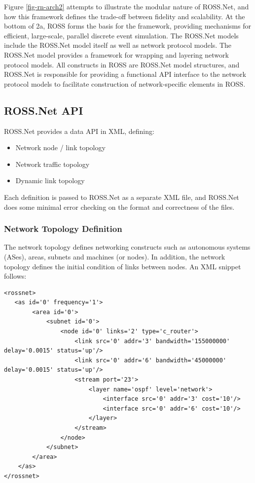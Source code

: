\documentclass[12pt]{article}
\begin{document}
Figure \ref{fig-rn-arch2} attempts to illustrate the modular nature of
ROSS.Net, and how this framework defines the trade-off between fidelity and
scalability.  At the bottom of 2a, ROSS forms the basis for the framework,
providing mechanisms for efficient, large-scale, parallel discrete event
simulation.  The ROSS.Net models include the ROSS.Net model itself as well as
network protocol models.  The ROSS.Net model provides a framework for wrapping
and layering network protocol models.  All constructs in ROSS are ROSS.Net
model structures, and ROSS.Net is responsible for providing a functional API
interface to the network protocol models to facilitate construction of
network-specific elements in ROSS.

\subsection{ROSS.Net API}

ROSS.Net provides a data API in XML, defining:

\begin{itemize}
  \item Network node / link topology
  \item Network traffic topology
  \item Dynamic link topology
\end{itemize}

Each definition is passed to ROSS.Net as a separate XML file, and ROSS.Net
does some minimal error checking on the format and correctness of the files.

\subsubsection{Network Topology Definition}

The network topology defines networking constructs such as autonomous systems
(ASes), areas, subnets and machines (or nodes).  In addition, the network
topology defines the initial condition of links between nodes.  An XML snippet
follows:

\begin{small}\begin{verbatim}
<rossnet>
   <as id='0' frequency='1'>
        <area id='0'>
            <subnet id='0'>
                <node id='0' links='2' type='c_router'>
                    <link src='0' addr='3' bandwidth='155000000' delay='0.0015' status='up'/>
                    <link src='0' addr='6' bandwidth='45000000' delay='0.0015' status='up'/>
                    <stream port='23'>
                        <layer name='ospf' level='network'>
                            <interface src='0' addr='3' cost='10'/>
                            <interface src='0' addr='6' cost='10'/>
                        </layer>
                    </stream>
                </node>
            </subnet>
        </area>
    </as>
</rossnet>
\end{verbatim}\end{small}
\end{document}
